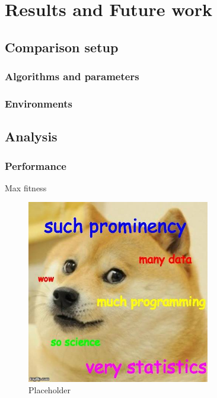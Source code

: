 \chapter{Results and Future work}
\label{chap:results}

\section{Comparison setup}
\subsection{Algorithms and parameters}

\subsection{Environments}

\section{Analysis}

\subsection{Performance}
Max fitness
\begin{figure}[H]
\centering
\includegraphics[width=8cm]{images/data_meme.jpg}
\caption{Placeholder}
\end{figure}
      
      
